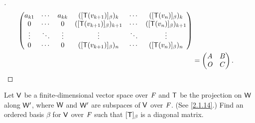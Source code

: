 \begin{proof}[]
\begin{align*}
\begin{pmatrix}
                       a_{k 1} & \cdots & a_{k k} & ([\mathsf{T}(v_{k + 1})]_{\beta})_k       & \cdots & ([\mathsf{T}(v_n)]_{\beta})_k       \\
                       0       & \cdots & 0       & ([\mathsf{T}(v_{k + 1})]_{\beta})_{k + 1} & \cdots & ([\mathsf{T}(v_n)]_{\beta})_{k + 1} \\
                       \vdots  & \ddots & \vdots  & \vdots                            & \ddots & \vdots                      \\
                       0       & \cdots & 0       & ([\mathsf{T}(v_{k + 1})]_{\beta})_{n}     & \cdots & ([\mathsf{T}(v_n)]_{\beta})_{n}
                     \end{pmatrix} \\
                 & = \begin{pmatrix}
                       A   & B \\
                       \mathit{O} & C
                     \end{pmatrix}.
  \end{align*}
\end{proof}

\begin{ex}\label{ex:2.2.12}
  Let \(\mathsf{V}\) be a finite-dimensional vector space over \(\mathit{F}\) and \(\mathsf{T}\) be the projection on \(\mathsf{W}\) along \(\mathsf{W}'\), where \(\mathsf{W}\) and \(\mathsf{W}'\) are subspaces of \(\mathsf{V}\) over \(\mathit{F}\).
  (See \cref{2.1.14}.)
  Find an ordered basis \(\beta\) for \(\mathsf{V}\) over \(\mathit{F}\) such that \([\mathsf{T}]_{\beta}\) is a diagonal matrix.
\end{ex}

